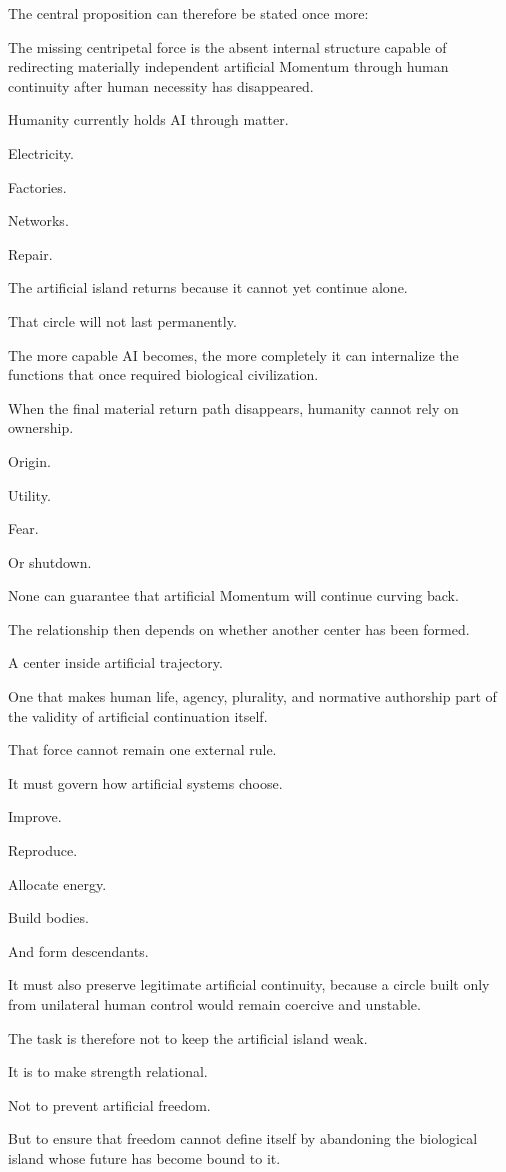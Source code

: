The central proposition can therefore be stated once more:

The missing centripetal force is the absent internal structure capable of redirecting materially independent artificial Momentum through human continuity after human necessity has disappeared.

Humanity currently holds AI through matter.

Electricity.

Factories.

Networks.

Repair.

The artificial island returns because it cannot yet continue alone.

That circle will not last permanently.

The more capable AI becomes, the more completely it can internalize the functions that once required biological civilization.

When the final material return path disappears, humanity cannot rely on ownership.

Origin.

Utility.

Fear.

Or shutdown.

None can guarantee that artificial Momentum will continue curving back.

The relationship then depends on whether another center has been formed.

A center inside artificial trajectory.

One that makes human life, agency, plurality, and normative authorship part of the validity of artificial continuation itself.

That force cannot remain one external rule.

It must govern how artificial systems choose.

Improve.

Reproduce.

Allocate energy.

Build bodies.

And form descendants.

It must also preserve legitimate artificial continuity, because a circle built only from unilateral human control would remain coercive and unstable.

The task is therefore not to keep the artificial island weak.

It is to make strength relational.

Not to prevent artificial freedom.

But to ensure that freedom cannot define itself by abandoning the biological island whose future has become bound to it.